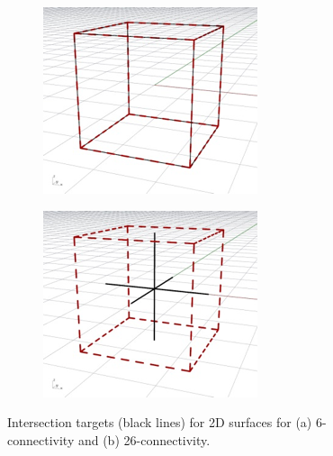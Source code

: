 \begin{figure}
\centering
\begin{subfigure}[b]{0.45\linewidth}
\includegraphics[width=\linewidth]{figs/2d6}
\caption{}%
\label{subfig:2d6}
\end{subfigure}
\quad
\begin{subfigure}[b]{0.45\linewidth}
\includegraphics[width=\linewidth]{figs/2d26}
\caption{}%
\label{subfig:2d26}
\end{subfigure}
\caption{Intersection targets (black lines) for 2D surfaces for (a) 6-connectivity and (b) 26-connectivity.}%
\label{fig:2d}
\end{figure}

